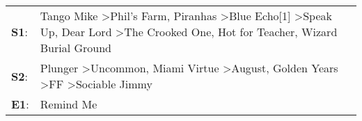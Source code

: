 \begin{supertabular}{p{0.03\textwidth}p{0.92\textwidth}}
 \textbf{S1}:  &  Tango Mike\textsuperscript{} \textgreater \enspace Phil's Farm\textsuperscript{}, \enspace Piranhas\textsuperscript{} \textgreater \enspace Blue Echo[1]\textsuperscript{} \textgreater \enspace Speak Up\textsuperscript{}, \enspace Dear Lord\textsuperscript{} \textgreater \enspace The Crooked One\textsuperscript{}, \enspace Hot for Teacher\textsuperscript{}, \enspace Wizard Burial Ground\textsuperscript{}  \enspace  \\
 \textbf{S2}:  &                                                                                                           Plunger\textsuperscript{} \textgreater \enspace Uncommon\textsuperscript{}, \enspace Miami Virtue\textsuperscript{} \textgreater \enspace August\textsuperscript{}, \enspace Golden Years\textsuperscript{} \textgreater \enspace FF\textsuperscript{} \textgreater \enspace Sociable Jimmy\textsuperscript{}  \enspace  \\
 \textbf{E1}:  &                                                                                                                                                                                                                                                                                                                                                                                             Remind Me\textsuperscript{}  \enspace  \\
\end{supertabular}
